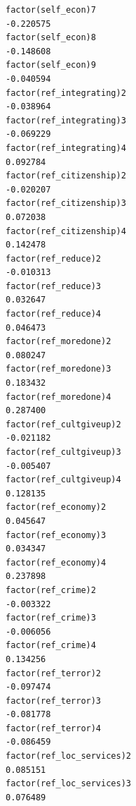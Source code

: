 \documentclass[
]{article}
\begin{document}
\begin{table}
\begin{minipage}[t]{\linewidth}
{\begin{verbatim}
factor(self_econ)7                                                                -0.220575
factor(self_econ)8                                                                -0.148608
factor(self_econ)9                                                                -0.040594
factor(ref_integrating)2                                                          -0.038964
factor(ref_integrating)3                                                          -0.069229
factor(ref_integrating)4                                                           0.092784
factor(ref_citizenship)2                                                          -0.020207
factor(ref_citizenship)3                                                           0.072038
factor(ref_citizenship)4                                                           0.142478
factor(ref_reduce)2                                                               -0.010313
factor(ref_reduce)3                                                                0.032647
factor(ref_reduce)4                                                                0.046473
factor(ref_moredone)2                                                              0.080247
factor(ref_moredone)3                                                              0.183432
factor(ref_moredone)4                                                              0.287400
factor(ref_cultgiveup)2                                                           -0.021182
factor(ref_cultgiveup)3                                                           -0.005407
factor(ref_cultgiveup)4                                                            0.128135
factor(ref_economy)2                                                               0.045647
factor(ref_economy)3                                                               0.034347
factor(ref_economy)4                                                               0.237898
factor(ref_crime)2                                                                -0.003322
factor(ref_crime)3                                                                -0.006056
factor(ref_crime)4                                                                 0.134256
factor(ref_terror)2                                                               -0.097474
factor(ref_terror)3                                                               -0.081778
factor(ref_terror)4                                                               -0.086459
factor(ref_loc_services)2                                                          0.085151
factor(ref_loc_services)3                                                          0.076489

\end{verbatim}}
\end{minipage}
\end{table}
\end{document}
